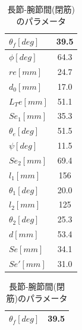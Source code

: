 \begin{table}[htbp]
  \begin{minipage}{0.5\hsize}
    \centering
    \vspace{5mm}
    \caption{長節-腕節間(開筋)のパラメータ}
    \label{tab:parameta_1_1}
    \vspace{-3mm}
    \begin{tabular}{|l|c|}
    \hline
    $\theta _f[deg]$ & 39.5                         \\ \hline
    $\phi[deg]     $ & 64.3                         \\ \hline
    $re[mm]        $ & 24.7                         \\ \hline
    $d_0[mm]       $ & 17.0                         \\ \hline
    $L_Te[mm]      $ & 51.1                         \\ \hline
    $Se_1[mm]      $ & 35.3                         \\ \hline
    $\theta_e[deg] $ & 51.5                         \\ \hline
    $\psi[deg]     $ & 11.5                         \\ \hline
    $Se_2[mm]      $ & 69.4                         \\ \hline
    $l_1[mm]       $ & 156                          \\ \hline
    $\theta_1[deg] $ & 20.0                         \\ \hline
    $l_2[mm]       $ & 125                          \\ \hline
    $\theta_2[deg] $ & 25.3                         \\ \hline
    $d[mm]         $ & 53.4                         \\ \hline
    $Se[mm]        $ & 34.1                         \\ \hline
    $Se'[mm]       $ & 31.0                         \\ \hline
    \end{tabular}
  \end{minipage}
  \begin{minipage}{0.5\hsize}
    \centering
    \vspace{5mm}
    \caption{長節-腕節間(閉筋)のパラメータ}
    \label{tab:parameta_1_2}
    \vspace{-3mm}
    \begin{tabular}{|l|c|}
    \hline
    $\theta _f[deg]$ & 39.5                         \\ \hline

\end{tabular}
\end{minipage}
\end{table}
